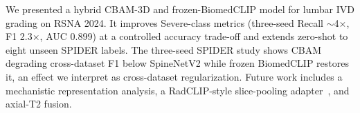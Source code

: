\documentclass[runningheads]{llncs}
\begin{document}
We presented a hybrid CBAM-3D and frozen-BiomedCLIP model for lumbar IVD grading on RSNA 2024. It improves Severe-class metrics (three-seed Recall $\sim$4$\times$, F1 2.3$\times$, AUC 0.899) at a controlled accuracy trade-off and extends zero-shot to eight unseen SPIDER labels. The three-seed SPIDER study shows CBAM degrading cross-dataset F1 below SpineNetV2 while frozen BiomedCLIP restores it, an effect we interpret as cross-dataset regularization. Future work includes a mechanistic representation analysis, a RadCLIP-style slice-pooling adapter~\cite{lu2024radclip}, and axial-T2 fusion.

%


\end{document}
